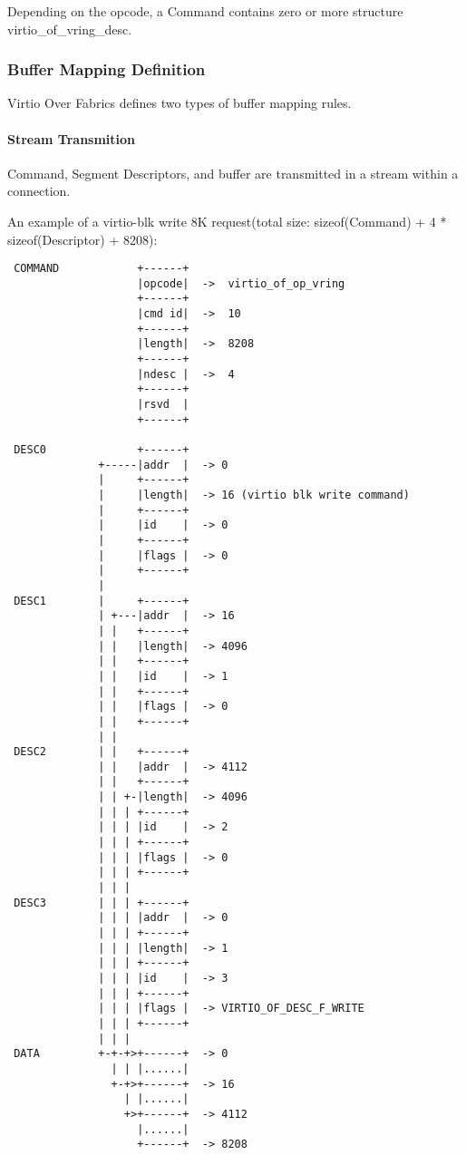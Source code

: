 Depending on the opcode, a Command contains zero or more structure virtio_of_vring_desc.

\subsubsection{Buffer Mapping Definition}\label{sec:Virtio Transport Options / Virtio Over Fabrics / Transmition Protocol / Buffer Mapping Definition}
Virtio Over Fabrics defines two types of buffer mapping rules.

\paragraph{Stream Transmition}\label{sec:Virtio Transport Options / Virtio Over Fabrics / Transmition Protocol / Commands Definition / Stream Transmition}
Command, Segment Descriptors, and buffer are transmitted in a stream within a connection.

An example of a virtio-blk write 8K request(total size: sizeof(Command) + 4 * sizeof(Descriptor) + 8208):
\begin{lstlisting}
 COMMAND            +------+
                    |opcode|  ->  virtio_of_op_vring
                    +------+
                    |cmd id|  ->  10
                    +------+
                    |length|  ->  8208
                    +------+
                    |ndesc |  ->  4
                    +------+
                    |rsvd  |
                    +------+

 DESC0              +------+
              +-----|addr  |  -> 0
              |     +------+
              |     |length|  -> 16 (virtio blk write command)
              |     +------+
              |     |id    |  -> 0
              |     +------+
              |     |flags |  -> 0
              |     +------+
              |
 DESC1        |     +------+
              | +---|addr  |  -> 16
              | |   +------+
              | |   |length|  -> 4096
              | |   +------+
              | |   |id    |  -> 1
              | |   +------+
              | |   |flags |  -> 0
              | |   +------+
              | |
 DESC2        | |   +------+
              | |   |addr  |  -> 4112
              | |   +------+
              | | +-|length|  -> 4096
              | | | +------+
              | | | |id    |  -> 2
              | | | +------+
              | | | |flags |  -> 0
              | | | +------+
              | | |
 DESC3        | | | +------+
              | | | |addr  |  -> 0
              | | | +------+
              | | | |length|  -> 1
              | | | +------+
              | | | |id    |  -> 3
              | | | +------+
              | | | |flags |  -> VIRTIO_OF_DESC_F_WRITE
              | | | +------+
              | | |
 DATA         +-+-+>+------+  -> 0
                | | |......|
                +-+>+------+  -> 16
                  | |......|
                  +>+------+  -> 4112
                    |......|
                    +------+  -> 8208
\end{lstlisting}

